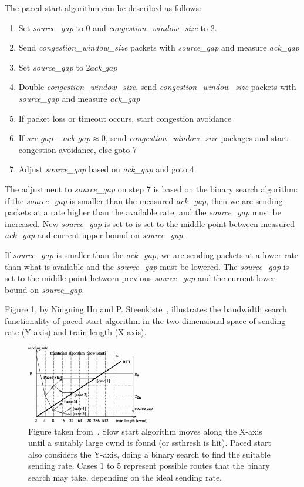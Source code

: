 The paced start algorithm can be described as follows:
\begin{enumerate}
	\item Set \textit{source\_gap} to 0 and \textit{congestion\_window\_size} to 2.
	\item Send \textit{congestion\_window\_size} packets with \textit{source\_gap} and measure \textit{ack\_gap}
	\item Set \textit{source\_gap} to $2 \textit{ack\_gap}$
	\item Double \textit{congestion\_window\_size}, send \textit{congestion\_window\_size} packets with \textit{source\_gap} and measure \textit{ack\_gap}
	\item If packet loss or timeout occurs, start congestion avoidance
	\item If $\textit{src\_gap} - \textit{ack\_gap} \approx 0$, send \textit{congestion\_window\_size} packages and start congestion avoidance, else goto 7
	\item Adjust \textit{source\_gap} based on \textit{ack\_gap} and goto 4 
\end{enumerate} 
The adjustment to \textit{source\_gap} on step 7 is based on the binary search algorithm: if the \textit{source\_gap} is smaller than the measured \textit{ack\_gap}, then we are sending packets at a rate higher than the available rate, and the \textit{source\_gap} must be increased. New \textit{source\_gap} is set to is set to the middle point between measured \textit{ack\_gap} and current upper bound on \textit{source\_gap}.

If \textit{source\_gap} is smaller than the \textit{ack\_gap}, we are sending packets at a lower rate than what is available and the \textit{source\_gap} must be lowered. The \textit{source\_gap} is set to the middle point between previous \textit{source\_gap} and the current lower bound on \textit{source\_gap}.

Figure \ref{fig:paced_start}, by Ningning Hu and P. Steenkiste~\cite{Hu03}, illustrates the bandwidth search functionality of paced start algorithm in the two-dimensional space of sending rate (Y-axis) and train length (X-axis).

\begin{figure}
	\includegraphics[width=0.5\textwidth]{images/hu03_paced_start_search.png}
	\caption{Figure taken from~\cite{Hu03}. Slow start algorithm moves along the X-axis until a suitably large cwnd is found (or ssthresh is hit). Paced start also considers the Y-axis, doing a binary search to find the suitable sending rate. Cases 1 to 5 represent possible routes that the binary search may take, depending on the ideal sending rate.}
	\label{fig:paced_start}
\end{figure}

